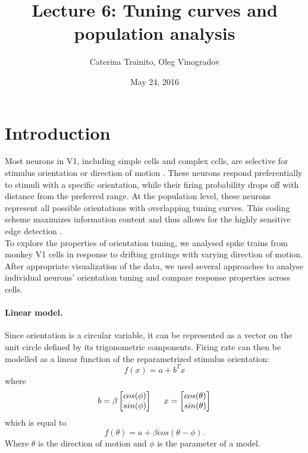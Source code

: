\documentclass[10pt]{article}
\title{Lecture 6: Tuning curves and population analysis}
\author{Caterina Trainito, Oleg Vinogradov}
\date{May 24, 2016}
\begin{document}
\maketitle

\section*{Introduction}

Most neurons in V1, including simple cells and complex cells, are selective for stimulus orientation or direction of motion \cite{hubel1962receptive}. These neurons respond preferentially to stimuli with a specific orientation, while their firing probability drops off with distance from the preferred range. At the population level, these neurons represent all possible orientations with overlapping tuning curves. This coding scheme maximizes information content \cite{snippe1996parameter} and thus allows for the highly sensitive edge detection \cite{marr1980theory}. \\

To explore the properties of orientation tuning, we analysed spike trains from monkey V1 cells in response to drifting gratings with varying direction of motion. After appropriate visualization of the data, we used several approaches to analyse individual neurons' orientation tuning and compare response properties across cells.
\paragraph{Linear model.} Since orientation is a circular variable, it can be represented as a vector on the unit circle defined by its trigonometric components. Firing rate can then be modelled as a linear function of the reparametrized stimulus orientation:
\begin{equation*}
f(x) = a+b^Tx
\end{equation*}
where 
\begin{align*}
b = \beta \begin{bmatrix}
cos (\phi) \\  sin (\phi )
 \end{bmatrix}  
 \hspace{5mm}
 x =  \begin{bmatrix}
cos (\theta) \\
  sin (\theta)
 \end{bmatrix} 
\end{align*}
which is equal to 
\begin{equation*}
f(\theta) = a+ \beta cos(\theta - \phi).
\end{equation*}
Where $\theta$ is the direction of motion and $\phi$ is the parameter of a model.\\
\end{document}

